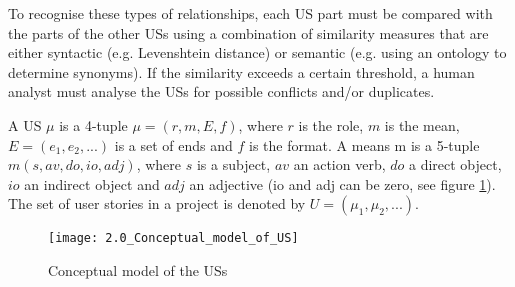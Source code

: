 To recognise these types of relationships, each US part must be compared with the parts of the other USs using a combination of similarity measures that are either syntactic (e.g. Levenshtein distance) or semantic (e.g. using an ontology to determine synonyms). If the similarity exceeds a certain threshold, a human analyst must analyse the USs for possible conflicts and/or duplicates.
\begin{definition}
A US $\mu$ is a 4-tuple $\mu=(r,m,E,f)$, where $r$ is the role, $m$ is the mean, $E=(e_1, e_2, . . .)$ is a set of ends and $f$ is the format. A means m is a 5-tuple $m (s,av,do,io,adj)$, where $s$ is a subject, $av$ an action verb, $do$ a direct object, $io$ an indirect object and $adj$ an adjective (io and adj can be zero, see figure \ref{fig:conceptual_model}). The set of user stories in a project is denoted by $U=(\mu_1, \mu_2, . . .)$.
\end{definition}
\begin{figure}[h]
\centering
\texttt{[image: 2.0\_Conceptual\_model\_of\_US]}
\caption{Conceptual model of the USs \cite{lucassen2016improving}}\label{fig:conceptual_model}
\end{figure}
